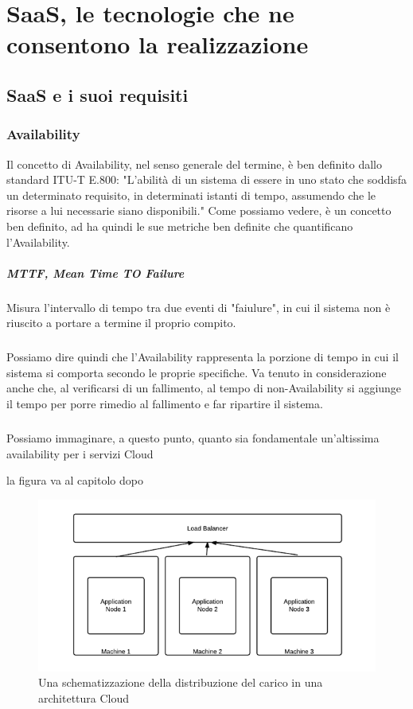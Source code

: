 \chapter{SaaS, le tecnologie che ne consentono la realizzazione}

\section{SaaS e i suoi requisiti}

\subsection{Availability}
Il concetto di Availability, nel senso generale del termine, è ben definito dallo standard ITU-T E.800: "L'abilità di un sistema di essere in uno stato che soddisfa un determinato requisito, in determinati istanti di tempo, assumendo che le risorse a lui necessarie siano disponibili." Come possiamo vedere, è un concetto ben definito, ad ha quindi le sue metriche ben definite che quantificano l'Availability. 

\paragraph{MTTF, Mean Time TO Failure}
Misura l'intervallo di tempo tra due eventi di "faiulure", in cui il sistema non è riuscito a portare a termine il proprio compito.

\paragraph{}
Possiamo dire quindi che l'Availability rappresenta la porzione di tempo in cui il sistema si comporta secondo le proprie specifiche. Va tenuto in considerazione anche che, al verificarsi di un fallimento, al tempo di non-Availability si aggiunge il tempo per porre rimedio al fallimento e far ripartire il sistema. 

\paragraph{}
Possiamo immaginare, a questo punto, quanto sia fondamentale un'altissima availability per i servizi Cloud 


la figura va al capitolo dopo
\begin{figure}[h!]
	\centering
	\includegraphics[width=\textwidth,keepaspectratio=true]{capitoli/imgs/LoadBalancer.png}
	\caption{Una schematizzazione della distribuzione del carico in una architettura Cloud}
\end{figure}
